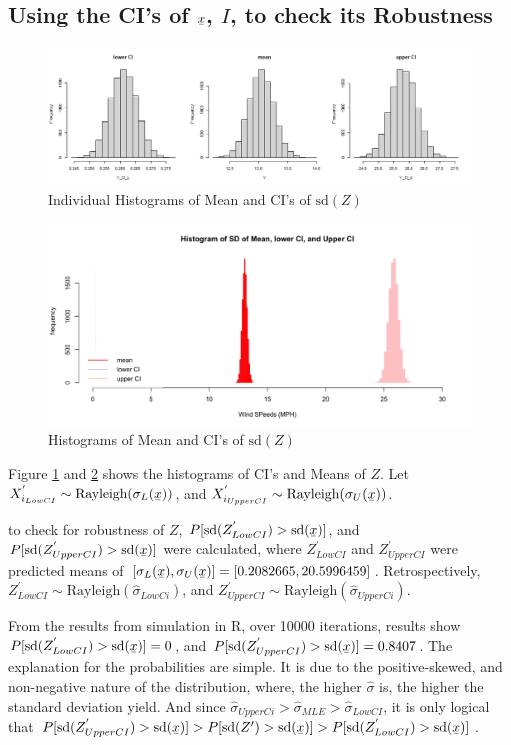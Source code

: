 \documentclass[11pt]{article}
\newcommand\barbelow[1]{\stackunder[1.2pt]{$#1$}{\rule{.8ex}{.075ex}}}
\begin{document}
\subsection{Using the CI's of $\barbelow{x}$, $I$, to check its Robustness}
\begin{figure}[!ht]
    \centering
    \includegraphics[width=\textwidth]{closeup.png}
    \caption{Individual Histograms of Mean and CI's of $\text{sd}(Z)$}
    \label{fig:closeup}
\end{figure}
\begin{figure}[!ht]
    \centering
    \includegraphics[width=13cm]{567Hist.png}
    \caption{Histograms of Mean and CI's of $\text{sd}(Z)$}
    \label{fig:spread}
\end{figure}
\FloatBarrier
Figure \ref{fig:closeup} and \ref{fig:spread} shows the histograms of CI's and Means of $Z$. Let $X^{'}_{i_{LowCI}}\sim\text{Rayleigh}(\sigma_{L}(\barbelow{x}))$, and $X^{'}_{i_{UpperCI}}\sim\text{Rayleigh}(\sigma_{U}(\barbelow{x}))$.\\
\par to check for robustness of $Z$, $P[\text{sd}(Z^{'}_{LowCI})>
\text{sd}(\barbelow{x})]$, and $P[\text{sd}(Z^{'}_{UpperCI})>
\text{sd}(\barbelow{x})]$ were calculated, where $Z^{'}_{LowCI}$ and $Z^{'}_{UpperCI}$ were predicted means of $\left[\sigma_{L}(\barbelow{x}),\sigma_{U}(\barbelow{x})\right]=[0.2082665, 20.5996459]$. Retrospectively, $Z^{'}_{LowCI}\sim\text{Rayleigh}(\hat{\sigma}_{LowCi})$, and $Z^{'}_{UpperCI}\sim\text{Rayleigh}(\hat{\sigma}_{UpperCi})$.\\
\par From the results from simulation in R, over 10000 iterations, results show $P[\text{sd}(Z^{'}_{LowCI})>
\text{sd}(\barbelow{x})]=0$, and $P[\text{sd}(Z^{'}_{UpperCI})>
\text{sd}(\barbelow{x})]=0.8407$. The explanation for the probabilities are simple. It is due to the positive-skewed, and non-negative nature of the distribution, where, the higher $\hat{\sigma}$ is, the higher the standard deviation yield. And since $\hat{\sigma}_{UpperCi}>\hat{\sigma}_{MLE}>\hat{\sigma}_{LowCI}$, it is only logical that $P[\text{sd}(Z^{'}_{UpperCI})>\text{sd}(\barbelow{x})]>P[\text{sd}(Z')>\text{sd}(\barbelow{x})]>P[\text{sd}(Z^{'}_{LowCI})>
\text{sd}(\barbelow{x})]$. 
\end{document}
